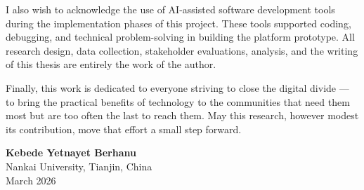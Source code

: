 I also wish to acknowledge the use of AI-assisted software development tools during the implementation phases of this project. These tools supported coding, debugging, and technical problem-solving in building the platform prototype. All research design, data collection, stakeholder evaluations, analysis, and the writing of this thesis are entirely the work of the author.

Finally, this work is dedicated to everyone striving to close the digital divide --- to bring the practical benefits of technology to the communities that need them most but are too often the last to reach them. May this research, however modest its contribution, move that effort a small step forward.

\vspace{2cm}
\begin{flushright}
\textbf{Kebede Yetnayet Berhanu}\\
Nankai University, Tianjin, China\\
March 2026
\end{flushright}

